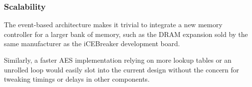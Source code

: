 \subsubsection{Scalability}
The event-based architecture makes it trivial to integrate a new memory controller for a larger bank of memory, such as the DRAM expansion sold by the same manufacturer as the iCEBreaker development board.

Similarly, a faster AES implementation relying on more lookup tables or an unrolled loop would easily slot into the current design without the concern for tweaking timings or delays in other components.
